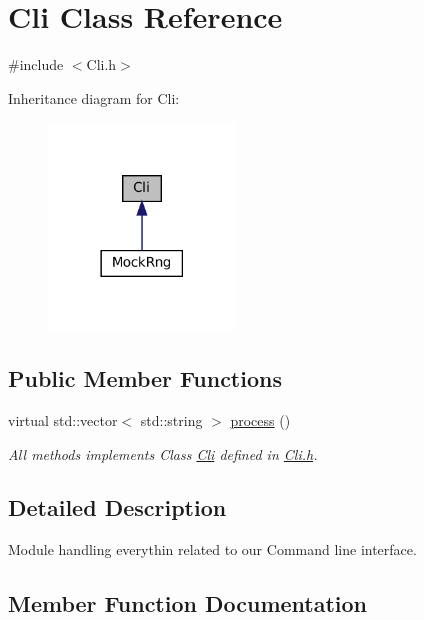 \hypertarget{classCli}{}\section{Cli Class Reference}
\label{classCli}


{\ttfamily \#include $<$Cli.\+h$>$}



Inheritance diagram for Cli\+:
\nopagebreak
\begin{figure}[H]
\begin{center}
\leavevmode
\includegraphics[width=141pt]{classCli__inherit__graph}
\end{center}
\end{figure}
\subsection*{Public Member Functions}
\begin{DoxyCompactItemize}
\item 
virtual std\+::vector$<$ std\+::string $>$ \hyperlink{classCli_a9788fa4a19943c09af95b4653822d690}{process} ()
\begin{DoxyCompactList}\small\item\em All methods implements Class \hyperlink{classCli}{Cli} defined in \hyperlink{Cli_8h_source}{Cli.\+h}. \end{DoxyCompactList}\end{DoxyCompactItemize}


\subsection{Detailed Description}
Module handling everythin related to our Command line interface. 

\subsection{Member Function Documentation}
\mbox{\label{classCli_a9788fa4a19943c09af95b4653822d690}} 

